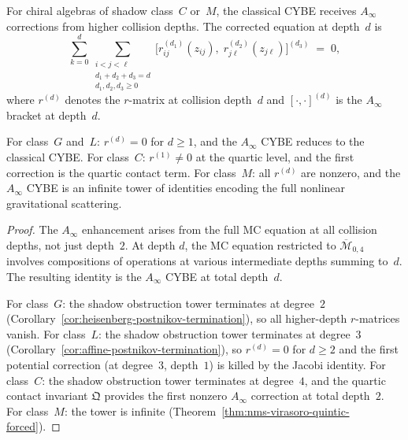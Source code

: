 \begin{proposition}
\label{prop:thqg-V-ainfty-ybe}
For chiral algebras of shadow class~$C$ or~$M$, the classical
CYBE receives $A_\infty$ corrections from higher collision depths.
The corrected equation at depth~$d$ is
\begin{equation}\label{eq:thqg-V-ainfty-ybe}
\sum_{k=0}^{d}
\sum_{\substack{i<j<\ell \\
 d_1 + d_2 + d_3 = d \\
 d_1, d_2, d_3 \geq 0}}
\bigl[
 r^{(d_1)}_{ij}(z_{ij}),\;
 r^{(d_2)}_{j\ell}(z_{j\ell})
\bigr]^{(d_3)}
\;=\; 0,
\end{equation}
where $r^{(d)}$ denotes the $r$-matrix at collision depth~$d$ and
$[\cdot,\cdot]^{(d)}$ is the $A_\infty$ bracket at depth~$d$.

For class~$G$ and~$L$: $r^{(d)} = 0$ for $d \geq 1$, and the
$A_\infty$ CYBE reduces to the classical CYBE\@.
For class~$C$: $r^{(1)} \neq 0$ at the quartic level, and the
first correction is the quartic contact term.
For class~$M$: all $r^{(d)}$ are nonzero, and the $A_\infty$ CYBE
is an infinite tower of identities encoding the full nonlinear
gravitational scattering.
\end{proposition}

\begin{proof}
The $A_\infty$ enhancement arises from the full MC equation at all
collision depths, not just depth~$2$. At depth $d$, the MC equation
restricted to $\overline{\mathcal{M}}_{0,4}$ involves compositions
of operations at various intermediate depths summing to~$d$. The
resulting identity is the $A_\infty$ CYBE at total depth~$d$.

For class~$G$: the shadow obstruction tower terminates at degree~$2$
(Corollary~\ref{cor:heisenberg-postnikov-termination}), so all
higher-depth $r$-matrices vanish.
For class~$L$: the shadow obstruction tower terminates at degree~$3$
(Corollary~\ref{cor:affine-postnikov-termination}), so $r^{(d)} = 0$
for $d \geq 2$ and the first potential correction (at degree~$3$,
depth~$1$) is killed by the Jacobi identity.
For class~$C$: the shadow obstruction tower terminates at degree~$4$, and the
quartic contact invariant $\mathfrak{Q}$ provides the first nonzero
$A_\infty$ correction at total depth~$2$.
For class~$M$: the tower is infinite
(Theorem~\ref{thm:nms-virasoro-quintic-forced}).
\end{proof}


